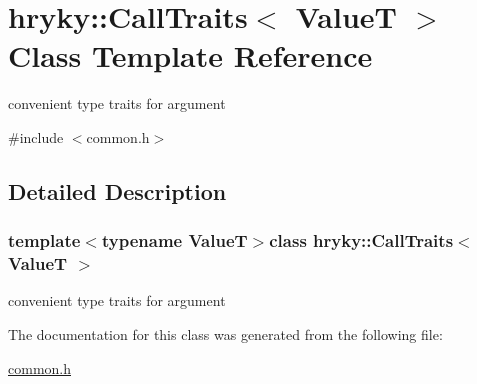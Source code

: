 \hypertarget{classhryky_1_1_call_traits}{\section{hryky\-:\-:Call\-Traits$<$ Value\-T $>$ Class Template Reference}
\label{classhryky_1_1_call_traits}
}


convenient type traits for argument  




{\ttfamily \#include $<$common.\-h$>$}



\subsection{Detailed Description}
\subsubsection*{template$<$typename Value\-T$>$class hryky\-::\-Call\-Traits$<$ Value\-T $>$}

convenient type traits for argument 

The documentation for this class was generated from the following file\-:\begin{DoxyCompactItemize}
\item 
\hyperlink{common_8h}{common.\-h}\end{DoxyCompactItemize}
